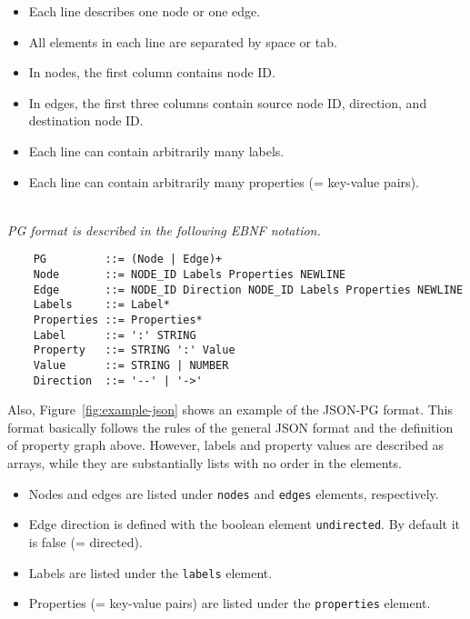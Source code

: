 \documentclass[runningheads]{llncs}
\begin{document}
\begin{itemize}
    \item Each line describes one node or one edge.
    \item All elements in each line are separated by space or tab.
    \item In nodes, the first column contains node ID.
    \item In edges, the first three columns contain source node ID, direction, and destination node ID.
    \item Each line can contain arbitrarily many labels.
    \item Each line can contain arbitrarily many properties (= key-value pairs).
\end{itemize}

\begin{defi}[PG Format]
\leavevmode \vspace{1mm} \\
\emph{PG format is described in the following EBNF notation.}
\begin{scriptsize}
\begin{verbatim}
    PG         ::= (Node | Edge)+
    Node       ::= NODE_ID Labels Properties NEWLINE
    Edge       ::= NODE_ID Direction NODE_ID Labels Properties NEWLINE
    Labels     ::= Label*
    Properties ::= Properties*
    Label      ::= ':' STRING
    Property   ::= STRING ':' Value
    Value      ::= STRING | NUMBER
    Direction  ::= '--' | '->'
\end{verbatim}
\end{scriptsize}
\end{defi}

Also, Figure~\ref{fig:example-json} shows an example of the JSON-PG format. This format basically follows the rules of the general JSON format and the definition of property graph above. However, labels and property values are described as arrays, while they are substantially lists with no order in the elements.  

\begin{itemize}
    \item Nodes and edges are listed under \texttt{nodes} and \texttt{edges} elements, respectively.
    \item Edge direction is defined with the boolean element \texttt{undirected}. By default it is false (= directed).
    \item Labels are listed under the \texttt{labels} element.
    \item Properties (= key-value pairs) are listed under the \texttt{properties} element.
\end{itemize}
\end{document}
